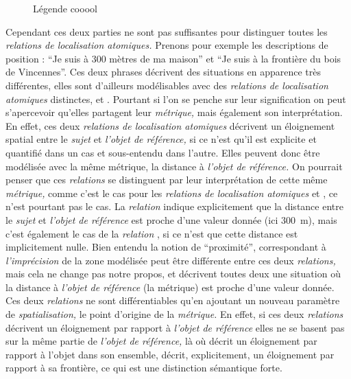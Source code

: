 \begin{figure}
  \centering
  
  \caption{Légende cooool}
  \label{fig:Exemple_Metrique_vs_Selecteur}
\end{figure}

Cependant ces deux parties ne sont pas suffisantes pour distinguer
toutes les \emph{relations de localisation atomiques.} Prenons pour
exemple les descriptions de position : \enquote{Je suis à 300 mètres
  de ma maison} et \enquote{Je suis à la frontière du bois de
  Vincennes}. Ces deux phrases décrivent des situations en apparence
très différentes, elles sont d'ailleurs modélisables avec des
\emph{relations de localisation atomiques} distinctes,
 et
. Pourtant si l'on se penche sur leur
signification on peut s’apercevoir qu'elles partagent leur
\emph{métrique,} mais également son interprétation. En effet, ces deux
\emph{relations de localisation atomiques} décrivent un éloignement
spatial entre le \emph{sujet} et \emph{l'objet de référence,} si ce
n'est qu'il est explicite et quantifié dans un cas et sous-entendu
dans l'autre. Elles peuvent donc être modélisée avec la même métrique,
la distance à \emph{l'objet de référence.} On pourrait penser que ces
\emph{relations} se distinguent par leur interprétation de cette même
\emph{métrique,} comme c'est le cas pour les \emph{relations de
  localisation atomiques}  et
, ce n'est pourtant pas le cas. La
\emph{relation}  indique
explicitement que la distance entre le \emph{sujet} et \emph{l'objet
  de référence} est proche d'une valeur donnée (ici \SI{300}{\meter}),
mais c'est également le cas de la \emph{relation}
, si ce n'est que cette distance est
implicitement nulle. Bien entendu la notion de \enquote{proximité},
correspondant à \emph{l'imprécision} de la zone modélisée peut être
différente entre ces deux \emph{relations,} mais cela ne change pas
notre propos,  et
 décrivent toutes deux une situation
où la distance à \emph{l'objet de référence} (\ie la métrique) est
proche d'une valeur donnée. Ces deux \emph{relations} ne sont
différentiables qu'en ajoutant un nouveau paramètre de
\emph{spatialisation,} le point d'origine de la \emph{métrique.} En
effet, si ces deux \emph{relations} décrivent un éloignement par
rapport à \emph{l'objet de référence} elles ne se basent pas sur la
même partie de \emph{l'objet de référence,} là où
 décrit un éloignement par rapport à
l'objet dans son ensemble,  décrit,
explicitement, un éloignement par rapport à sa frontière, ce qui est
une distinction sémantique forte.

